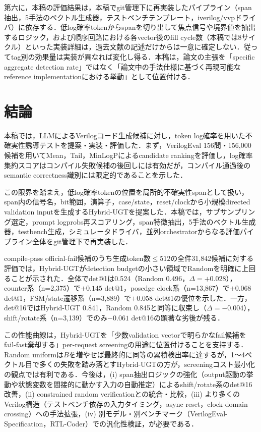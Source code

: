 \documentclass[submit,techrep,noauthor]{ipsj}
\begin{document}
第六に，本稿の評価結果は，本稿でgit管理下に再実装したパイプライン（span抽出，5手法のベクトル生成器，テストベンチテンプレート，iverilog/vvpドライバ）に依存する．低log確率tokenからspanを切り出して焦点信号や境界値を抽出するロジック，および順序回路における各vector後のfill cycle数（本稿では8サイクル）といった実装詳細は，過去文献の記述だけからは一意に確定しない．従ってtag別の効果量は実装が異なれば変化し得る．本稿は，論文の主張を「specific aggregate detection rate」ではなく「論文中の手法仕様に基づく再現可能なreference implementationにおける挙動」として位置付ける．

\section{結論}

本稿では，LLMによるVerilogコード生成候補に対し，token log確率を用いた不確実性誘導テストを提案・実装・評価した．まず，VerilogEval 156問・156,000候補を用いてMean，Tail，MinLogPによるcandidate rankingを評価し，log確率集約スコアはコンパイル失敗候補の後回しには有効だが，コンパイル通過後のsemantic correctness識別には限定的であることを示した．

この限界を踏まえ，低log確率tokenの位置を局所的不確実性spanとして扱い，span内の信号名，bit範囲，演算子，case/state，reset/clockから小規模directed validation inputを生成するHybrid-UGTを提案した．本稿では，サブサンプリング選定，prompt logprobs再スコアリング，span特徴抽出，5手法のベクトル生成器，testbench生成，シミュレータドライバ，並列orchestratorからなる評価パイプライン全体をgit管理下で再実装した．

compile-pass official-fail候補のうち生成token数$\le 512$の全件31,842候補に対する評価では，Hybrid-UGTがdetection budgetの小さい領域でRandomを明確に上回ることが示された．全体でdet@1は0.524（Random 0.496，$\Delta=+0.028$），counter系（n=2,375）で$+0.145$ det@1，posedge clock系（n=13,867）で$+0.068$ det@1，FSM/state遷移系（n=3,889）で$+0.058$ det@1の優位を示した．一方，det@16ではHybrid-UGT 0.841，Random 0.845と同等に収束し（$\Delta=-0.004$），shift/rotate系（n=3,139）でのみ$-0.061$ det@16の顕著な劣後が残る．

この性能曲線は，Hybrid-UGTを「少数validation vectorで明らかなfail候補をfail-fast棄却する」per-request screeningの用途に位置付けることを支持する．Random uniformは$B$を増やせば最終的に同等の累積検出率に達するが，1〜4ベクトル目で多くの失敗を踏み落とすHybrid-UGTの方が，screeningコスト最小化の観点では有利である．今後は，(i) span抽出ロジックの強化（output駆動の挙動や状態変数を間接的に動かす入力の自動推定）によるshift/rotate系のdet@16改善，(ii) constrained random verificationとの統合・比較，(iii) より多くのVerilog構造（テストベンチ依存の入力タイミング，async reset，clock-domain crossing）への手法拡張，(iv) 別モデル・別ベンチマーク（VerilogEval-Specification，RTL-Coder）での汎化性検証，が必要である．



\end{document}
